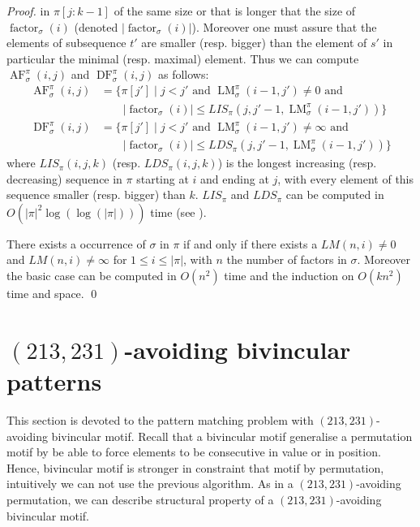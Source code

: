 \documentclass[a4paper]{llncs}
\newcommand{\ptext}{\pi}
\newcommand{\pmotif}{\sigma}
\newcounter{num}
\DeclareMathOperator{\factora}{factor}
\newcommand{\factor}[2]{\factora_{{#1}}({#2})}
\DeclareMathOperator{\LMa}{LM}
\newcommand{\LM}[4]{\LMa_{{#1}}^{{#2}}(#3,#4)}
\DeclareMathOperator{\AFa}{AF}
\newcommand{\AF}[4]{\AFa_{{#1}}^{{#2}}(#3,#4)}
\DeclareMathOperator{\DFa}{DF}
\newcommand{\DF}[4]{\DFa_{{#1}}^{{#2}}(#3,#4)}
\begin{document}
\begin{proof}
in $\ptext[j:k-1]$ of the same size or that is longer that
the size of $\factor{\pmotif}{i}$ (denoted $|\factor{\pmotif}{i}|$).
Moreover one must assure that the elements of subsequence 
$t'$ are smaller (resp. bigger) than the element of $s'$ 
in particular the minimal (resp. maximal) element.
Thus we can compute $\AF{\pmotif}{\ptext}{i}{j}$ and $\DF{\pmotif}{\ptext}{i}{j}$ as follows:
\begin{align*}
\AF{\pmotif}{\ptext}{i}{j}
&=
\text{$\{\ptext[j'] \;|\; j<j'$ and $\LM{\pmotif}{\ptext}{i-1}{j'} \neq 0$ and} 
\\
&\qquad 
\text{$|\factor{\pmotif}{i}| \leq LIS_{\ptext}(j,j'-1,\LM{\pmotif}{\ptext}{i-1}{j'})\}$} 
\\
\DF{\pmotif}{\ptext}{i}{j}
&=
\text{$\{\ptext[j'] \;|\; j<j'$ and $\LM{\pmotif}{\ptext}{i-1}{j'} \neq \infty$ and}
\\
&\qquad
\text{$|\factor{\pmotif}{i}| \leq LDS_{\ptext}(j,j'-1,\LM{\pmotif}{\ptext}{i-1}{j'})\}$}
\end{align*}
where $LIS_{\ptext}(i,j,k)$ (resp. $LDS_{\ptext}(i,j,k)$) is the longest increasing 
(resp. decreasing) sequence in $\ptext$ starting at $i$ and ending at $j$,
with every element of this sequence
smaller (resp. bigger) than $k$.
$LIS_{\ptext}$ and $LDS_{\ptext}$ can be computed in 
$O(|\ptext|^2\log(\log(|\ptext|)))$ time (see \cite{Bespamyatnikh00enumeratinglongest}).

There exists a occurrence of $\pmotif$ in $\ptext$ if and only if
there exists a $LM(n,i)\neq 0$ and $LM(n,i)\neq \infty$ for $1 \leq i \leq |\ptext|$,
with $n$ the number of factors in $\pmotif$.
Moreover the basic case can be computed in $O(n^2)$ time
and the induction on $O(kn^2)$ time and space.
\qed
\end{proof}


\section{$(213,231)$-avoiding bivincular patterns}
	\label{section:bivincular}

This section is devoted to the pattern matching problem with $(213,231)$-avoiding bivincular motif.
Recall that a bivincular motif generalise a permutation motif by
be able to force elements to be consecutive in value or in position.
Hence,  bivincular motif is stronger in constraint that motif by permutation, 
intuitively we can not use the previous algorithm.
As in a $(213,231)$-avoiding permutation, we can describe structural property of 
a $(213,231)$-avoiding bivincular motif.
\end{document}

